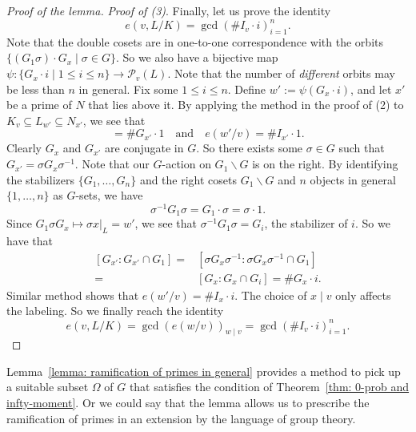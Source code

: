 \documentclass{amsart}
\numberwithin{equation}{section}
\theoremstyle{plain}
\theoremstyle{definition}
\theoremstyle{remark}
\begin{document}
\begin{proof}[Proof of the lemma]
    \emph{Proof of (3)}.    
    Finally, let us prove the identity
	\begin{equation*}
		e(v,L/K)=\gcd(\# I_{v}\cdot i)_{i=1}^n.
	\end{equation*}
	Note that the double cosets are in one-to-one correspondence with the orbits $\{(G_1\sigma)\cdot G_{x}\mid\sigma\in G\}$.
	So we also have a bijective map $\psi:\{G_{x}\cdot i\mid1\leq i\leq n\}\to\mathcal{P}_{v}(L)$.
	Note that the number of \emph{different} orbits may be less than $n$ in general.
	Fix some $1\leq i\leq n$.
        Define $w':=\psi(G_{x}\cdot i)$, and let $x'$ be a prime of $N$ that lies above it.
	By applying the method in the proof of (2) to $K_{v}\subseteq L_{w'}\subseteq N_{x'}$, we see that 
	\begin{equation*}
		[L_{w'}:K_{v}]=\# G_{x'}\cdot 1\quad\text{and}\quad e(w'/v)=\# I_{x'}\cdot 1.
	\end{equation*}	
	Clearly $G_{x}$ and $G_{x'}$ are conjugate in $G$.
	So there exists some $\sigma\in G$ such that $G_{x'}=\sigma G_{x}\sigma^{-1}$.
	Note that our $G$-action on $G_1\backslash G$ is on the right.
        By identifying the stabilizers $\{G_1,\dots,G_n\}$ and the right cosets $G_1\backslash G$ and $n$ objects in general $\{1,\dots,n\}$ as $G$-sets, we have 
	\begin{equation*}
		\sigma^{-1}G_1\sigma=G_1\cdot\sigma=\sigma\cdot 1.
	\end{equation*}
	Since $G_1\sigma G_{x}\mapsto\sigma x\vert_L=w'$, we see that $\sigma^{-1}G_1\sigma=G_i$, the stabilizer of $i$.
	So we have that
	\begin{equation*}
		\begin{aligned}
			[G_{x'}:G_{x'}\cap G_1]
			=&[\sigma G_{x}\sigma^{-1}:\sigma G_{x}\sigma^{-1}\cap G_1]
			\\
			=&[G_{x}:G_{x}\cap G_i]
			=\# G_{x}\cdot i.
		\end{aligned}		
	\end{equation*}
	Similar method shows that $e(w'/v)=\# I_{x}\cdot i$.
	The choice of $x\mid v$ only affects the labeling.
	So we finally reach the identity
	\begin{equation*}
		e(v,L/K)=\gcd(e(w/v))_{w\mid v}=\gcd(\# I_{v}\cdot i)_{i=1}^n.
	\end{equation*}
\end{proof}
Lemma~\ref{lemma: ramification of primes in general} provides a method to pick up a suitable subset $\Omega$ of $G$ that satisfies the condition of Theorem~\ref{thm: 0-prob and infty-moment}.
Or we could say that the lemma allows us to prescribe the ramification of primes in an extension by the language of group theory.
\end{document}
